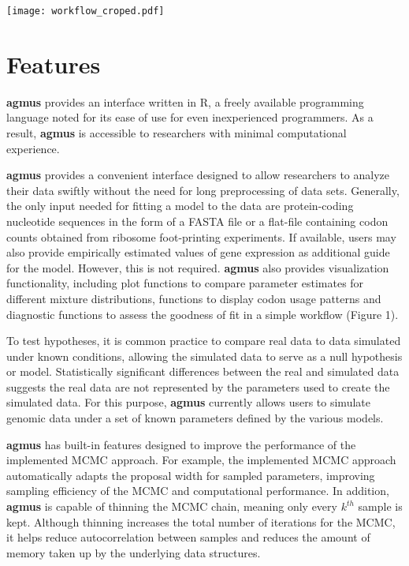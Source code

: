 \documentclass{bioinfo}
\newcommand{\package}{\textbf{agmus }} %
\begin{document}
\begin{figure*}[!tpb]
\centering
 \texttt{[image: workflow\_croped.pdf]}
\vspace{-0.2cm}
\caption{\textbf{Package overview and plotting functionality.} \package \textbf{Illustration of the angus workflow.} 
\package allows for the easy estimation of population genetics parameters from genome scale data such as CDS or ribosome footprints. 
Furthermore, \package provides functionality for MCMC diagnostics and visualization. 
}
\label{fig:plotbin}
\end{figure*}

\section*{Features}
\package provides an interface written in R, a freely available programming language noted for its ease of use for even inexperienced programmers. 
As a result, \package is accessible to researchers with minimal computational experience. 

\package provides a convenient interface designed to allow researchers to analyze their data swiftly without the need for long preprocessing of data sets. 
Generally, the only input needed for fitting a model to the data are protein-coding nucleotide sequences in the form of a FASTA file or a flat-file containing codon counts obtained from ribosome foot-printing experiments. 
If available, users may also provide empirically estimated values of gene expression as additional guide for the model. However, this is not required.
\package also provides visualization functionality, including plot functions to compare parameter estimates for different mixture distributions, functions to display codon usage patterns and diagnostic functions to assess the goodness of fit in a simple workflow (Figure 1).

To test hypotheses, it is common practice to compare real data to data simulated under known conditions, allowing the simulated data to serve as a null hypothesis or model. Statistically significant differences between the real and simulated data suggests the real data are not represented by the parameters used to create the simulated data. For this purpose, \package currently allows users to simulate genomic data under a set of known parameters defined by the various models.

\package has built-in features designed to improve the performance of the implemented MCMC approach. For example, the implemented MCMC approach automatically adapts the proposal width for sampled parameters, improving sampling efficiency of the MCMC and computational performance. In addition, \package is capable of thinning the MCMC chain, meaning only every $k^{th}$ sample is kept. Although thinning increases the total number of iterations for the MCMC, it helps reduce autocorrelation between samples and reduces the amount of memory taken up by the underlying data structures. 
\end{document}
